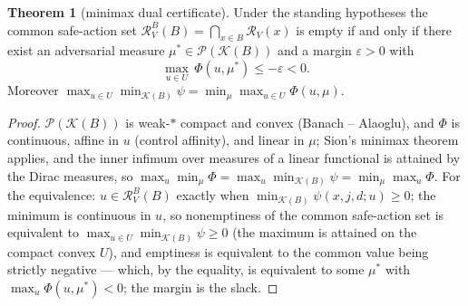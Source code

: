 \documentclass[10pt,twocolumn]{article}
\theoremstyle{definition}
\newtheorem{theorem}{Theorem}
\begin{document}
\begin{theorem}[minimax dual certificate]\label{thm:dual}
Under the standing hypotheses the common safe-action set
$\mathcal{R}^{B}_{V}(B) = \bigcap_{x \in B}\mathcal{R}_{V}(x)$ is empty if
and only if there exist an adversarial measure
$\mu^{*} \in \mathscr{P}(\mathcal{K}(B))$ and a margin $\varepsilon > 0$
with
\begin{equation*}
\max_{u \in U}\,\Phi(u,\mu^{*}) \le -\varepsilon < 0.
\tag{$\star$}
\end{equation*}
Moreover
$\max_{u \in U}\min_{\mathcal{K}(B)}\psi
 = \min_{\mu}\max_{u \in U}\Phi(u,\mu)$.
\end{theorem}
\begin{proof}
$\mathscr{P}(\mathcal{K}(B))$ is weak-$*$ compact and convex (Banach --
Alaoglu), and $\Phi$ is continuous, affine in $u$ (control affinity), and
linear in $\mu$; Sion's minimax theorem applies, and the inner infimum
over measures of a linear functional is attained by the Dirac measures,
so
$\max_{u}\min_{\mu}\Phi = \max_{u}\min_{\mathcal{K}(B)}\psi
 = \min_{\mu}\max_{u}\Phi$.
For the equivalence: $u \in \mathcal{R}^{B}_{V}(B)$ exactly when
$\min_{\mathcal{K}(B)}\psi(x,j,d;u) \ge 0$; the minimum is continuous in
$u$, so nonemptiness of the common safe-action set is equivalent to
$\max_{u \in U}\min_{\mathcal{K}(B)}\psi \ge 0$ (the maximum is attained
on the compact convex $U$), and emptiness is equivalent to the common
value being strictly negative --- which, by the equality, is equivalent to
some $\mu^{*}$ with $\max_{u}\Phi(u,\mu^{*}) < 0$; the margin is the
slack.
\end{proof}
\end{document}
